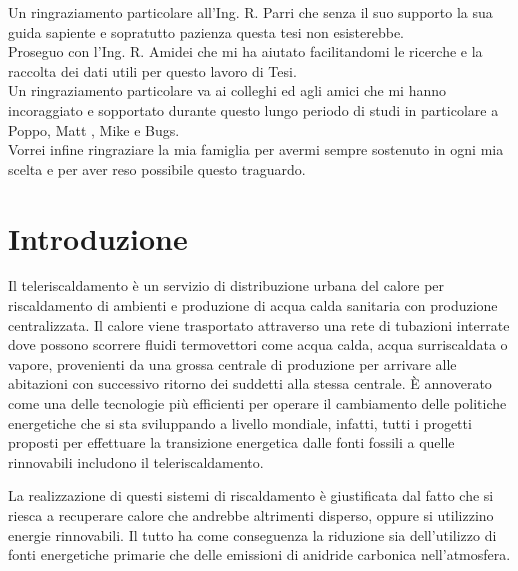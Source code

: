 \documentclass[laurea,oneside,11pt]{USiena_tesiLM}
\begin{document}
Un ringraziamento particolare all'Ing. R. Parri che senza il suo supporto la sua guida sapiente e sopratutto pazienza questa tesi non esisterebbe. \\

Proseguo con l'Ing. R. Amidei che mi ha aiutato facilitandomi le ricerche e la raccolta dei dati utili per questo lavoro di Tesi.\\

Un ringraziamento particolare va ai colleghi ed agli amici che mi hanno incoraggiato e sopportato durante questo lungo periodo di studi in particolare a Poppo, Matt , Mike e Bugs. \\

Vorrei infine ringraziare la mia famiglia per avermi sempre sostenuto in ogni mia scelta e per aver reso possibile questo traguardo.            %
\
%
\tableofcontents            %
%


\mainmatter

\chapter*{Introduzione}

Il teleriscaldamento è un  servizio  di  distribuzione  urbana  del calore per  riscaldamento di ambienti e produzione di acqua calda sanitaria con produzione centralizzata. Il calore viene trasportato attraverso una rete di tubazioni interrate dove possono scorrere  fluidi termovettori come acqua calda, acqua surriscaldata o vapore, provenienti da una grossa centrale di produzione per arrivare alle abitazioni con successivo ritorno dei suddetti alla stessa centrale. È annoverato come una delle tecnologie più efficienti per operare il cambiamento delle politiche energetiche che si sta sviluppando a livello mondiale, infatti, tutti i progetti proposti per effettuare la transizione energetica dalle fonti fossili a quelle rinnovabili includono il teleriscaldamento. 

La realizzazione di questi sistemi di riscaldamento è giustificata dal fatto che si riesca a recuperare calore che andrebbe altrimenti disperso, oppure si utilizzino energie rinnovabili. Il tutto ha come conseguenza la riduzione sia dell'utilizzo di fonti energetiche primarie che delle emissioni di anidride carbonica nell'atmosfera.
\end{document}

